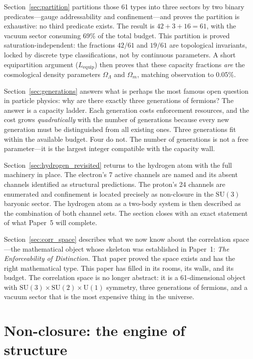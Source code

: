 \documentclass[11pt]{article}
\newcommand{\SU}{\mathrm{SU}}
\newcommand{\U}{\mathrm{U}}
\begin{document}
Section~\ref{sec:partition} partitions those 61 types into three sectors by two binary predicates---gauge addressability and confinement---and proves the partition is exhaustive: no third predicate exists.  The result is $42 + 3 + 16 = 61$, with the vacuum sector consuming 69\% of the total budget.  This partition is proved saturation-independent: the fractions $42/61$ and $19/61$ are topological invariants, locked by discrete type classifications, not by continuous parameters.  A short equipartition argument ($L_{\mathrm{equip}}$) then proves that these capacity fractions \emph{are} the cosmological density parameters $\Omega_\Lambda$ and $\Omega_m$, matching observation to 0.05\%.

Section~\ref{sec:generations} answers what is perhaps the most famous open question in particle physics: why are there exactly three generations of fermions?  The answer is a capacity ladder.  Each generation costs enforcement resources, and the cost grows \emph{quadratically} with the number of generations because every new generation must be distinguished from all existing ones.  Three generations fit within the available budget.  Four do not.  The number of generations is not a free parameter---it is the largest integer compatible with the capacity wall.

Section~\ref{sec:hydrogen_revisited} returns to the hydrogen atom with the full machinery in place.  The electron's 7 active channels are named and its absent channels identified as structural predictions.  The proton's 24 channels are enumerated and confinement is located precisely as non-closure in the $\SU(3)$ baryonic sector.  The hydrogen atom as a two-body system is then described as the combination of both channel sets.  The section closes with an exact statement of what Paper~5 will complete.

Section~\ref{sec:corr_space} describes what we now know about the correlation space---the mathematical object whose skeleton was established in Paper~1: \emph{The Enforceability of Distinction}.  That paper proved the space exists and has the right mathematical type.  This paper has filled in its rooms, its walls, and its budget.  The correlation space is no longer abstract: it is a 61-dimensional object with $\SU(3) \times \SU(2) \times \U(1)$ symmetry, three generations of fermions, and a vacuum sector that is the most expensive thing in the universe.


\section{Non-closure: the engine of structure}
\label{sec:nonclosure}
\end{document}
